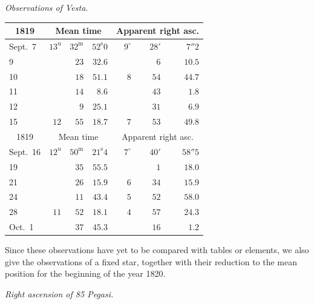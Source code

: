 \emph{Observations of Vesta.}

\begin{center}
\begin{tabular}{l|rrr|rrr}
\multicolumn{1}{c|}{1819}  &  \multicolumn{3}{c|}{Mean time}  &  \multicolumn{3}{c}{Apparent right asc.}  \\
\hline
Sept.\ 7  &  $13^{\mathrm u}$  &  $32^{\mathrm m}$  &  $52^{\mathrm s}0$  &  $9^\circ$  &  $28'$  &  $7''2$  \\
9  &   &  $23$  &  $32.6$  &   &  $6$  &  $10.5$  \\
10  &   &  $18$  &  $51.1$  &  $8$  &  $54$  &  $44.7$  \\
11  &   &  $14$  &  $8.6$  &   &  $43$  &  $1.8$  \\
12  &   &  $9$  &  $25.1$  &   &  $31$  &  $6.9$  \\
15  &  $12$  &  $55$  &  $18.7$  &  $7$  &  $53$  &  $49.8$  \\
\hline
 \multicolumn{1}{c|}{1819}  &  \multicolumn{3}{c|}{Mean time}  &  \multicolumn{3}{c}{Apparent right asc.}  \\
\hline
 Sept.\ 16  &  $12^{\mathrm u}$  &  $50^{\mathrm m}$  &  $21^{\mathrm s}4$  &  $7^\circ$  &  $40'$  &  $58''5$  \\
 19  &   &  $35$  &  $55.5$  &   &  $1$  &  $18.0$  \\
 21  &   &  $26$  &  $15.9$  &  $6$  &  $34$  &  $15.9$  \\
 24  &   &  $11$  &  $43.4$  &  $5$  &  $52$  &  $58.0$  \\
 28  &  $11$  &  $52$  &  $18.1$  &  $4$  &  $57$  &  $24.3$  \\
 Oct.\ 1  &   &  $37$  &  $45.3$  &   &  $16$  &  $1.2$  \\
\end{tabular}
\end{center}

\par\indent Since these observations have yet to be compared with tables or elements, we also give the observations of a fixed star, together with their reduction to the mean position for the beginning of the year 1820.


\begin{center}
\emph{Right ascension of 85 Pegasi.}
\end{center}

